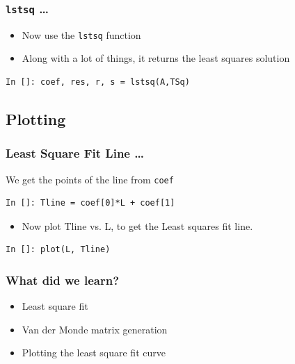 \documentclass[14pt,compress]{beamer}
\newcommand{\typ}[1]{\lstinline{#1}}
\begin{document}
\begin{frame}[fragile]
\frametitle{\typ{lstsq} \ldots}
\begin{itemize}
\item Now use the \typ{lstsq} function
\item Along with a lot of things, it returns the least squares solution
\end{itemize}
\begin{lstlisting}
In []: coef, res, r, s = lstsq(A,TSq)
\end{lstlisting}
\end{frame}

\subsection{Plotting}
\begin{frame}[fragile]
\frametitle{Least Square Fit Line \ldots}
We get the points of the line from \typ{coef}
\begin{lstlisting}
In []: Tline = coef[0]*L + coef[1]
\end{lstlisting}
\begin{itemize}
\item Now plot Tline vs. L, to get the Least squares fit line. 
\end{itemize}
\begin{lstlisting}
In []: plot(L, Tline)
\end{lstlisting}
\end{frame}

\begin{frame}[fragile]
  \frametitle{What did we learn?}
  \begin{itemize}
   \item Least square fit
   \item Van der Monde matrix generation
   \item Plotting the least square fit curve
  \end{itemize}
\end{frame}
\end{document}
